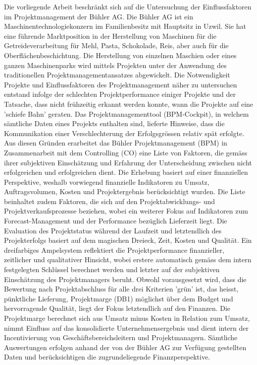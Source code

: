 \newline\newline Die vorliegende Arbeit beschränkt sich auf die Untersuchung der Einflussfaktoren im Projektmanagement der Bühler AG. Die Bühler AG ist ein Maschinentechnologiekonzern im Familienbesitz mit Hauptsitz in Uzwil. Sie hat eine führende Marktposition in der Herstellung von Maschinen für die Getreideverarbeitung für Mehl, Pasta, Schokolade, Reis, aber auch für die Oberflächenbeschichtung. Die Herstellung von einzelnen Maschien oder eines ganzen Maschinenparks wird mittels Projekten unter der Anwendung des traditionellen Projektmanagementansatzes abgewickelt. Die Notwendigkeit Projekte und Einflussfaktoren des Projektmanagement näher zu untersuchen entstand infolge der schlechten Projektperformance einiger Projekte und der Tatsache, dass nicht frühzeitig erkannt werden konnte, wann die Projekte auf eine 'schiefe Bahn' geraten. Das Projektmanagementtool (BPM-Cockpit), in welchem sämtliche Daten eines Projekts enthalten sind, lieferte Hinweise, dass die Kommunikation einer Verschlechterung der Erfolgsgrössen relativ spät erfolgte. Aus diesen Gründen erarbeitet das Bühler Projektmanagement (BPM) in Zusammenarbeit mit dem Controlling (CO) eine Liste von Faktoren, die gemäss ihrer subjektiven Einschätzung und Erfahrung der Unterscheidung zwischen nicht erfolgreichen und erfolgreichen dient. Die Erhebung basiert auf einer finanziellen Perspektive, weshalb vorwiegend finanzielle Indikatoren zu Umsatz, Auftragsvolumen, Kosten und Projektergebnis berücksichtigt wurden. Die Liste beinhaltet zudem Faktoren, die sich auf den Projektabwicklungs- und Projektverkaufsprozesse beziehen, wobei ein weiterer Fokus auf Indikatoren zum Forecast-Management und der Performance bezüglich Lieferzeit liegt. Die Evaluation des Projektstatus während der Laufzeit und letztendlich des Projekterfolgs basiert auf dem magischen Dreieck, Zeit, Kosten und Qualität. Ein dreifarbiges Ampelsystem reflektiert die Projektperformance finanzieller, zeitlicher und qualitativer Hinsicht, wobei erstere automatisch gemäss dem intern festgelegten Schlüssel berechnet werden und letzter auf der subjektiven Einschätzung des Projektmanagers beruht. Obwohl vorausgesetzt wird, dass die Bewertung nach Projektabschluss für alle drei Kriterien 'grün' ist, das heisst, pünktliche Lieferung, Projektmarge (DB1) möglichst über dem Budget und hervorragende Qualität, liegt der Fokus letztendlich auf den Finanzen. Die Projektmarge berechnet sich aus Umsatz minus Kosten in Relation zum Umsatz, nimmt Einfluss auf das konsolidierte Unternehmensergebnis und dient intern der Incentivierung von Geschäftsbereichsleitern und Projektmanagern. Sämtliche Auswertungen erfolgen anhand der von der Bühler AG zur Verfügung gestellten Daten und berücksichtigen die zugrundeliegende Finanzperspektive. 
